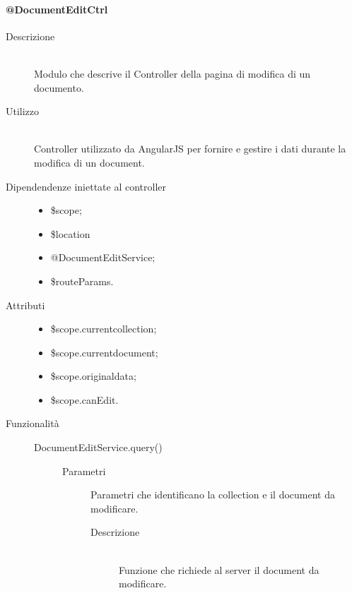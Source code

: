 \paragraph{@DocumentEditCtrl}
\begin{description}
 \item[Descrizione] \hfill \\
 Modulo che descrive il Controller della pagina di modifica di un documento.
 
 \item[Utilizzo] \hfill \\
 Controller utilizzato da AngularJS per fornire e gestire i dati durante la modifica di un document.
 
 \item[Dipendendenze iniettate al controller] \hfill
 \begin{itemize}
  \item \$scope;
  \item \$location
  \item @DocumentEditService;
  \item \$routeParams.
  
 \end{itemize}
 
 \item[Attributi] \hfill
 \begin{itemize}
 	\item  \$scope.current\textunderscore collection;
    \item  \$scope.current\textunderscore document;
    \item  \$scope.original\textunderscore data;
    \item  \$scope.canEdit.
 \end{itemize}
 
 \item[Funzionalità] \hfill
 \begin{description}
  \item[DocumentEditService.query()] \hfill
   \begin{description}
  	\item[Parametri]
  		\begin{mldescription}
       
        Parametri che identificano la collection e il document da modificare.
  		\end{mldescription}
  	\begin{description}
  	\item[Descrizione] \hfill \\
	Funzione che richiede al server il document da modificare.
	\end{description}
  \end{description}
 

\end{description}
\end{description}
